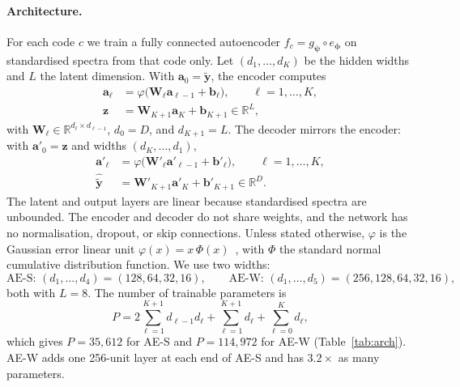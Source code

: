 \paragraph{Architecture.}
For each code $c$ we train a fully connected autoencoder $f_c = g_{\bm{\psi}}\circ e_{\bm{\phi}}$ on standardised spectra from that code only.
Let $(d_1,\dots,d_K)$ be the hidden widths and $L$ the latent dimension.
With $\mathbf{a}_0=\tilde{\mathbf{y}}$, the encoder computes
\begin{align}
  \mathbf{a}_{\ell} &= \varphi\bigl(\mathbf{W}_{\ell}\mathbf{a}_{\ell-1}+\mathbf{b}_{\ell}\bigr),\qquad \ell=1,\dots,K, \label{eq:enc}\\
  \mathbf{z} &= \mathbf{W}_{K+1}\mathbf{a}_{K}+\mathbf{b}_{K+1}\in\mathbb{R}^{L}, \label{eq:latent}
\end{align}
with $\mathbf{W}_{\ell}\in\mathbb{R}^{d_{\ell}\times d_{\ell-1}}$, $d_0=D$, and $d_{K+1}=L$.
The decoder mirrors the encoder: with $\mathbf{a}'_0=\mathbf{z}$ and widths $(d_K,\dots,d_1)$,
\begin{align}
  \mathbf{a}'_{\ell} &= \varphi\bigl(\mathbf{W}'_{\ell}\mathbf{a}'_{\ell-1}+\mathbf{b}'_{\ell}\bigr),\qquad \ell=1,\dots,K, \label{eq:dec}\\
  \hat{\tilde{\mathbf{y}}} &= \mathbf{W}'_{K+1}\mathbf{a}'_{K}+\mathbf{b}'_{K+1}\in\mathbb{R}^{D}. \label{eq:out}
\end{align}
The latent and output layers are linear because standardised spectra are unbounded.
The encoder and decoder do not share weights, and the network has no normalisation, dropout, or skip connections.
Unless stated otherwise, $\varphi$ is the Gaussian error linear unit $\varphi(x)=x\,\Phi(x)$~\cite{TODO_hendrycks_gelu}, with $\Phi$ the standard normal cumulative distribution function.
We use two widths:
\begin{equation}
  \text{AE-S: } (d_1,\dots,d_4)=(128,64,32,16),\qquad
  \text{AE-W: } (d_1,\dots,d_5)=(256,128,64,32,16),
  \label{eq:widths}
\end{equation}
both with $L=8$.
The number of trainable parameters is
\begin{equation}
  P = 2\sum_{\ell=1}^{K+1}d_{\ell-1}d_{\ell} + \sum_{\ell=1}^{K+1}d_{\ell} + \sum_{\ell=0}^{K}d_{\ell},
  \label{eq:params}
\end{equation}
which gives $P=35{,}612$ for AE-S and $P=114{,}972$ for AE-W (Table~\ref{tab:arch}).
AE-W adds one 256-unit layer at each end of AE-S and has $3.2\times$ as many parameters.

